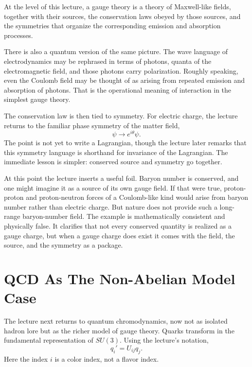 \begin{definition}
At the level of this lecture, a gauge theory is a theory of Maxwell-like fields, together with their sources, the conservation laws obeyed by those sources, and the symmetries that organize the corresponding emission and absorption processes.
\end{definition}

There is also a quantum version of the same picture. The wave language of electrodynamics may be rephrased in terms of photons, quanta of the electromagnetic field, and those photons carry polarization. Roughly speaking, even the Coulomb field may be thought of as arising from repeated emission and absorption of photons. That is the operational meaning of interaction in the simplest gauge theory.

The conservation law is then tied to symmetry. For electric charge, the lecture returns to the familiar phase symmetry of the matter field,
\begin{equation}
\psi \to e^{i\theta}\psi.
\end{equation}
The point is not yet to write a Lagrangian, though the lecture later remarks that this symmetry language is shorthand for invariance of the Lagrangian. The immediate lesson is simpler: conserved source and symmetry go together.

At this point the lecture inserts a useful foil. Baryon number is conserved, and one might imagine it as a source of its own gauge field. If that were true, proton-proton and proton-neutron forces of a Coulomb-like kind would arise from baryon number rather than electric charge. But nature does not provide such a long-range baryon-number field. The example is mathematically consistent and physically false. It clarifies that not every conserved quantity is realized as a gauge charge, but when a gauge charge does exist it comes with the field, the source, and the symmetry as a package.

\section{QCD As The Non-Abelian Model Case}

The lecture next returns to quantum chromodynamics, now not as isolated hadron lore but as the richer model of gauge theory. Quarks transform in the fundamental representation of \(SU(3)\). Using the lecture's notation,
\begin{equation}
q_i' = U_{ij}q_j.
\end{equation}
Here the index \(i\) is a color index, not a flavor index.

